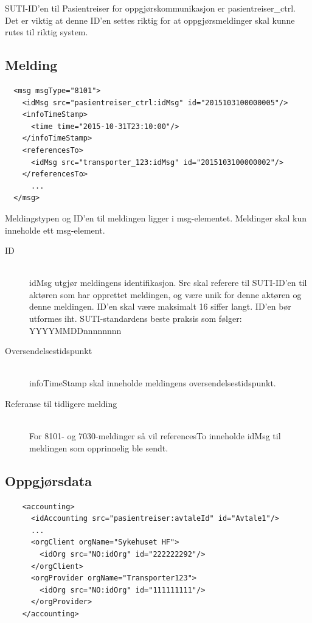 \documentclass[a4paper,titlepage,norsk,11pt]{article}
\begin{document}
SUTI-ID'en til Pasientreiser for oppgjørskommunikasjon er pasientreiser\_ctrl. Det er viktig at denne ID'en settes riktig for at oppgjørsmeldinger skal kunne rutes til riktig system.

\subsection{Melding}

\begin{lstlisting}
  <msg msgType="8101">
    <idMsg src="pasientreiser_ctrl:idMsg" id="2015103100000005"/>
    <infoTimeStamp>
      <time time="2015-10-31T23:10:00"/>
    </infoTimeStamp>
    <referencesTo>
      <idMsg src="transporter_123:idMsg" id="2015103100000002"/>
    </referencesTo>
      ...
  </msg>
\end{lstlisting}

Meldingstypen og ID'en til meldingen ligger i msg-elementet. Meldinger skal kun inneholde ett msg-element.

\begin{description}

	\item[ID] \hfill \\
	idMsg utgjør meldingens identifikasjon. Src skal referere til SUTI-ID'en til aktøren som har opprettet meldingen, og være unik for denne aktøren og denne meldingen. ID'en skal være maksimalt 16 siffer langt. ID'en bør utformes iht. SUTI-standardens beste praksis som følger: YYYYMMDDnnnnnnnn

	\item[Oversendelsestidspunkt] \hfill \\
	infoTimeStamp skal inneholde meldingens oversendelsestidspunkt.

	\item[Referanse til tidligere melding] \hfill \\
	For 8101- og 7030-meldinger så vil referencesTo inneholde idMsg til meldingen som opprinnelig ble sendt.

\end{description}

\subsection{Oppgjørsdata}

\begin{lstlisting}
    <accounting>
      <idAccounting src="pasientreiser:avtaleId" id="Avtale1"/>
      ...
      <orgClient orgName="Sykehuset HF">
        <idOrg src="NO:idOrg" id="222222292"/>
      </orgClient>
      <orgProvider orgName="Transporter123">
        <idOrg src="NO:idOrg" id="111111111"/>
      </orgProvider>
    </accounting>
\end{lstlisting}
\end{document}
